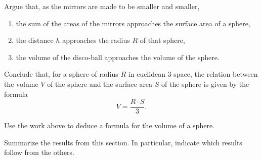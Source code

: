 \documentclass[newpage,hints,handout,noauthor,nooutcomes,12pt]{ximera}
\begin{document}
\begin{problem}
Argue that, as the mirrors are made to be smaller and smaller,
\begin{enumerate}
\item the sum of the areas of the mirrors approaches the surface area of a sphere,
\item the distance $h$ approaches the radius $R$ of that sphere,
\item the volume of the disco-ball approaches the volume of the sphere.
\end{enumerate}
Conclude that, for a sphere of radius $R$ in euclidean $3$-space, the relation
between the volume $V$ of the sphere and the surface area $S$ of the sphere is
given by the formula%
\[
V=\frac{R\cdot S}{3}.
\]
\end{problem}

\begin{problem}
Use the work above to deduce a formula for the volume of a sphere.
\end{problem}




\begin{problem}
Summarize the results from this section. In particular, indicate which
results follow from the others.
\begin{freeResponse}
\end{freeResponse}
\end{problem}
\end{document}
